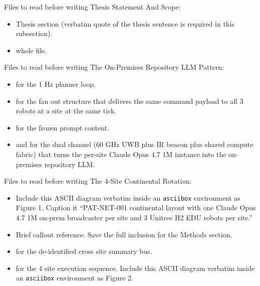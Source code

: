 \begin{sectionaccent}
Files to read before writing Thesis Statement And Scope:
\begin{itemize}
  \item {}
        Thesis section (verbatim quote of the thesis sentence is
        required in this subsection).
  \item {}
        whole file.
\end{itemize}

Files to read before writing The On-Premises Repository LLM Pattern:
\begin{itemize}
  \item {}
        for the 1 Hz planner loop.
  \item {}
        for the fan out structure that delivers the same command
        payload to all 3 robots at a site at the same tick.
  \item {}
        for the frozen prompt content.
  \item {}
        and
        for the dual channel (60 GHz UWB plus IR beacon plus shared
        compute fabric) that turns the per-site Claude Opus 4.7 1M
        instance into the on-premises repository LLM.
\end{itemize}

Files to read before writing The 4-Site Continental Rotation:
\begin{itemize}
  \item {}
        Include this ASCII diagram verbatim inside an \texttt{asciibox}
        environment as Figure 1. Caption it
        ``PAT-NET-001 continental layout with one Claude Opus 4.7 1M
        on-prem broadcaster per site and 3 Unitree H2 EDU robots per
        site.''
  \item {}
        Brief callout reference. Save the full inclusion for the
        Methods section.
  \item {}
        for the de-identified cross site summary bus.
  \item {}
        for the 4 site execution sequence. Include this ASCII diagram
        verbatim inside an \texttt{asciibox} environment as Figure 2.
\end{itemize}


\end{sectionaccent}
